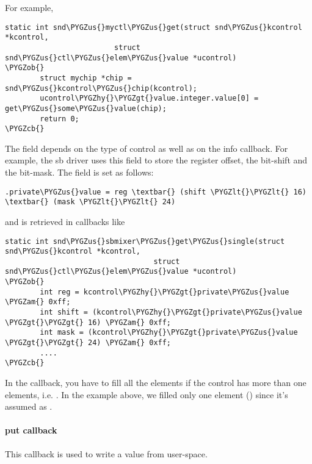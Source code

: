 \documentclass[a4paper,8pt,english]{sphinxmanual}
\def\PYGZus{\char`\_}
\def\PYGZob{\char`\{}
\def\PYGZcb{\char`\}}
\def\PYGZam{\char`\&}
\def\PYGZlt{\char`\<}
\def\PYGZgt{\char`\>}
\def\PYGZhy{\char`\-}
\begin{document}
For example,

\begin{Verbatim}[commandchars=\\\{\}]
static int snd\PYGZus{}myctl\PYGZus{}get(struct snd\PYGZus{}kcontrol *kcontrol,
                         struct snd\PYGZus{}ctl\PYGZus{}elem\PYGZus{}value *ucontrol)
\PYGZob{}
        struct mychip *chip = snd\PYGZus{}kcontrol\PYGZus{}chip(kcontrol);
        ucontrol\PYGZhy{}\PYGZgt{}value.integer.value[0] = get\PYGZus{}some\PYGZus{}value(chip);
        return 0;
\PYGZcb{}
\end{Verbatim}

The  field depends on the type of control as well as on the
info callback. For example, the sb driver uses this field to store the
register offset, the bit-shift and the bit-mask. The 
field is set as follows:

\begin{Verbatim}[commandchars=\\\{\}]
.private\PYGZus{}value = reg \textbar{} (shift \PYGZlt{}\PYGZlt{} 16) \textbar{} (mask \PYGZlt{}\PYGZlt{} 24)
\end{Verbatim}

and is retrieved in callbacks like

\begin{Verbatim}[commandchars=\\\{\}]
static int snd\PYGZus{}sbmixer\PYGZus{}get\PYGZus{}single(struct snd\PYGZus{}kcontrol *kcontrol,
                                  struct snd\PYGZus{}ctl\PYGZus{}elem\PYGZus{}value *ucontrol)
\PYGZob{}
        int reg = kcontrol\PYGZhy{}\PYGZgt{}private\PYGZus{}value \PYGZam{} 0xff;
        int shift = (kcontrol\PYGZhy{}\PYGZgt{}private\PYGZus{}value \PYGZgt{}\PYGZgt{} 16) \PYGZam{} 0xff;
        int mask = (kcontrol\PYGZhy{}\PYGZgt{}private\PYGZus{}value \PYGZgt{}\PYGZgt{} 24) \PYGZam{} 0xff;
        ....
\PYGZcb{}
\end{Verbatim}

In the  callback, you have to fill all the elements if the
control has more than one elements, i.e. . In the example
above, we filled only one element () since
it's assumed as .


\paragraph{put callback}
\label{sound/kernel-api/writing-an-alsa-driver:put-callback}
This callback is used to write a value from user-space.
\end{document}
